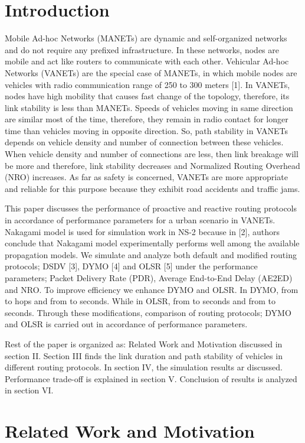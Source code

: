 \documentclass[journal]{IEEEtran}
\begin{document}
\section{Introduction}
Mobile Ad-hoc Networks (MANETs) are dynamic and self-organized networks and do not require any prefixed infrastructure. In these networks, nodes are mobile and act like routers to communicate with each other. Vehicular Ad-hoc Networks (VANETs) are the special case of MANETs, in which mobile nodes are vehicles with radio communication range of 250 to 300 meters [1]. In VANETs, nodes have high mobility that causes fast change of the topology, therefore, its link stability is less than MANETs. Speeds of vehicles moving in same direction are similar most of the time, therefore, they remain in radio contact for longer time than vehicles moving in opposite direction. So, path stability in VANETs depends on vehicle density and number of connection between these vehicles. When vehicle density and number of connections are less, then link breakage will be more and therefore, link stability decreases and Normalized Routing Overhead (NRO) increases. As far as safety is concerned, VANETs are more appropriate and reliable for this purpose because they exhibit road accidents and traffic jams.

This paper discusses the performance of proactive and reactive routing protocols in accordance of performance parameters for a urban scenario in VANETs. Nakagami model is used for simulation work in NS-2 because in [2], authors conclude that Nakagami model experimentally performs well among the available propagation models. We simulate and analyze both default and modified routing protocols; DSDV [3], DYMO [4] and OLSR [5] under the performance parameters; Packet Delivery Rate (PDR), Average End-to-End Delay (AE2ED) and NRO. To improve efficiency we enhance DYMO and OLSR. In DYMO,  from  to  hops and  from  to  seconds. While in OLSR,  from  to  seconds and  from  to  seconds. Through these modifications, comparison of routing protocols; DYMO and OLSR is carried out in accordance of performance parameters.

Rest of the paper is organized as: Related Work and Motivation discussed in section II. Section III finds the link duration and path stability of vehicles in different routing protocols. In section IV, the simulation results ar discussed. Performance trade-off is explained in section V. Conclusion of results is analyzed in section VI.

\section{Related Work and Motivation}
\end{document}
